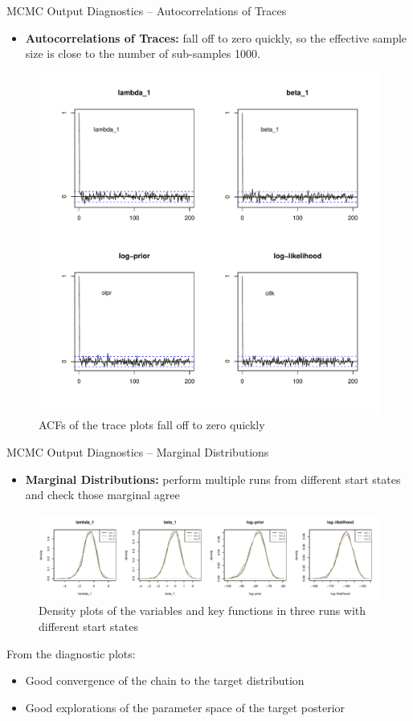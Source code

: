 \begin{frame}{MCMC Output Diagnostics -- Autocorrelations of Traces}
\vspace{0.2cm}
\begin{itemize}
\item \textbf{Autocorrelations of Traces:} fall off to zero quickly, so the effective sample size is close to the number of sub-samples 1000.
\end{itemize}

\begin{figure}
\centering
\includegraphics[width=.5\linewidth]{img/acf.pdf}
\caption{ACFs of the trace plots fall off to zero quickly}
\label{fig:acf}
\end{figure}
\end{frame}

\begin{frame}{MCMC Output Diagnostics -- Marginal Distributions}
\begin{itemize}
\item \textbf{Marginal Distributions:} perform multiple runs from different start states and check those marginal agree
\vspace{0.2cm}
\end{itemize}

\begin{figure}
\centering
\includegraphics[width=\linewidth]{img/runs.pdf}
\caption{Density plots of the variables and key functions in three runs with different start states}
\label{fig:runs}
\end{figure}

From the diagnostic plots:
\vspace{0.2cm}
\begin{itemize}
\item Good convergence of the chain to the target distribution
\item Good explorations of the parameter space of the target posterior
\end{itemize}
\end{frame}

